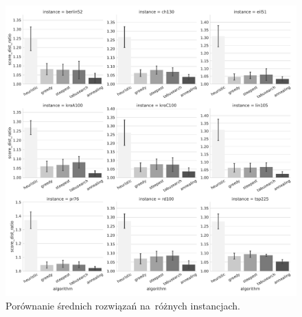 \begin{figure}[H]
\begin{center}
\includegraphics[width=1.0\textwidth]{graphs/score_comparison_bar_avg.pdf}
\end{center}
\caption{Porównanie średnich rozwiązań na~różnych instancjach.}
\label{fig:avg}
\end{figure}


